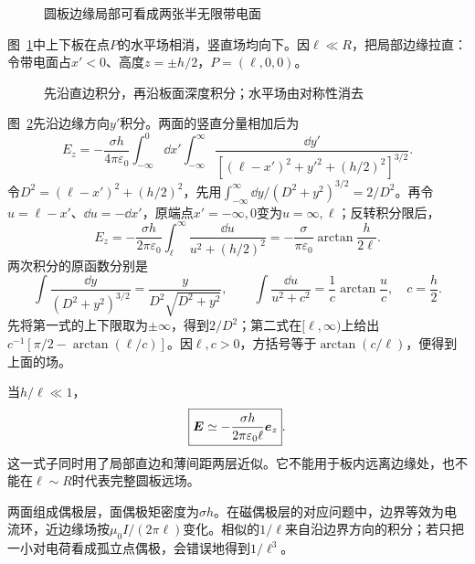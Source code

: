 \begin{figure}[H]\centering
{}
\caption{圆板边缘局部可看成两张半无限带电面}\label{fig:i4-e4-q}
\end{figure}
\begin{solution}
图~\ref{fig:i4-e4-q}中上下板在点$P$的水平场相消，竖直场均向下。因$\ell\ll R$，把局部边缘拉直：令带电面占$x'<0$、高度$z=\pm h/2$，$P=(\ell,0,0)$。


\begin{figure}[H]\centering
{}
\caption{先沿直边积分，再沿板面深度积分；水平场由对称性消去}\label{fig:i4-e4-s}
\end{figure}

图~\ref{fig:i4-e4-s}先沿边缘方向$y'$积分。两面的竖直分量相加后为
\[
E_z=-\frac{\sigma h}{4\pi\varepsilon_0}
\int_{-\infty}^0\dd x'\int_{-\infty}^{\infty}
\frac{\dd y'}{[(\ell-x')^2+y'^2+(h/2)^2]^{3/2}}.
\]
令$D^2=(\ell-x')^2+(h/2)^2$，先用$\int_{-\infty}^{\infty}\dd y/(D^2+y^2)^{3/2}=2/D^2$。再令$u=\ell-x'$、$\dd u=-\dd x'$，原端点$x'=-\infty,0$变为$u=\infty,\ell$；反转积分限后，
\[
E_z=-\frac{\sigma h}{2\pi\varepsilon_0}
\int_\ell^\infty\frac{\dd u}{u^2+(h/2)^2}
=-\frac{\sigma}{\pi\varepsilon_0}\arctan\frac{h}{2\ell}.
\]
两次积分的原函数分别是
\[
\int\frac{\dd y}{(D^2+y^2)^{3/2}}
=\frac{y}{D^2\sqrt{D^2+y^2}},\qquad
\int\frac{\dd u}{u^2+c^2}=\frac1c\arctan\frac uc,\quad c=\frac h2.
\]
先将第一式的上下限取为$\pm\infty$，得到$2/D^2$；第二式在$[\ell,\infty)$上给出
$c^{-1}[\pi/2-\arctan(\ell/c)]$。因$\ell,c>0$，方括号等于$\arctan(c/\ell)$，便得到上面的场。

当$h/\ell\ll1$，
\[
\boxed{\bm{E}\simeq-\frac{\sigma h}{2\pi\varepsilon_0\ell}\bm{e}_z}.
\]
这一式子同时用了局部直边和薄间距两层近似。它不能用于板内远离边缘处，也不能在$\ell\sim R$时代表完整圆板远场。

两面组成偶极层，面偶极矩密度为$\sigma h$。在磁偶极层的对应问题中，边界等效为电流环，近边缘场按$\mu_0I/(2\pi\ell)$变化。相似的$1/\ell$来自沿边界方向的积分；若只把一小对电荷看成孤立点偶极，会错误地得到$1/\ell^3$。
\end{solution}


